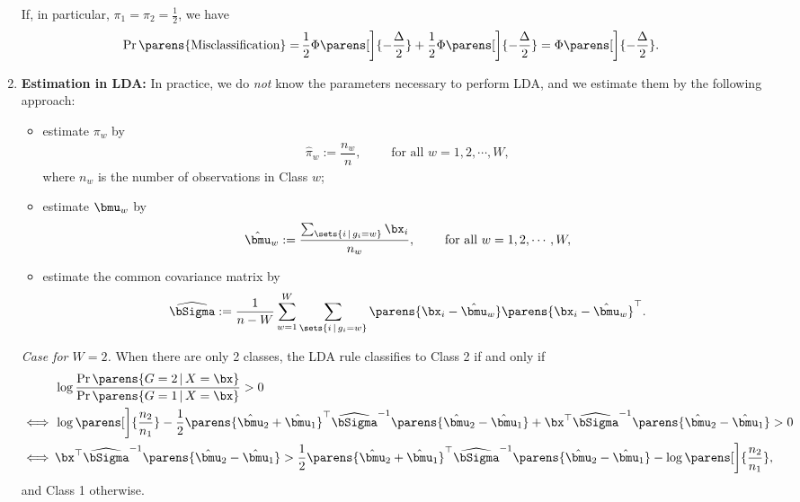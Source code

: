 \documentclass[12pt]{article}
\begin{document}
\begin{enumerate}[label=\textbf{\arabic*.}]
	If, in particular, $\pi_1 = \pi_2 = \frac{1}{2}$, we have 
	\begin{align*}
		\Pr \parens{\text{Misclassification}} = & \, \frac{1}{2} \Phi \parens[\bigg]{- \frac{\Delta}{2}} + \frac{1}{2} \Phi \parens[\bigg]{- \frac{\Delta}{2}} = \Phi \parens[\bigg]{- \frac{\Delta}{2}}. 
	\end{align*}
	
	\item \textbf{Estimation in LDA:} In practice, we do \emph{not} know the parameters necessary to perform LDA, and we estimate them by the following approach: 
	\begin{itemize}
		\item estimate $\pi_w$ by 
		\begin{align*}
			\hat{\pi}_w := \dfrac{n_w}{n}, \qquad \text{ for all } w = 1, 2, \cdots, W, 
		\end{align*}
		where $n_w$ is the number of observations in Class $w$; 
		\item estimate $\bmu_w$ by 
		\begin{align*}
			\hat{\bmu}_w := \dfrac{\sum_{\sets{i \,\vert\, g_i = w}} \bx_i}{n_w}, \qquad \text{ for all } w = 1, 2, \cdots, W, 
		\end{align*}
		\item estimate the common covariance matrix by 
		\begin{align*}
			\widehat{\bSigma} := \dfrac{1}{n-W} \sum_{w=1}^W \sum_{\sets{i \,\vert\, g_i = w}} \parens{\bx_i - \hat{\bmu}_w}\parens{\bx_i - \hat{\bmu}_w}^\top. 
		\end{align*}
	\end{itemize}
	
	\textit{Case for $W = 2$.} When there are only 2 classes, the LDA rule classifies to Class 2 if and only if
	\begin{align}
		& \, \log \frac{\Pr \parens{G = 2 \,\vert\, X = \bx}}{\Pr \parens{G = 1 \,\vert\, X = \bx}} > 0 \nonumber \\ 
		\iff & \, \log \parens[\bigg]{\frac{n_2}{n_1}} - \frac{1}{2} \parens{\hat{\bmu}_2 + \hat{\bmu}_1}^\top \widehat{\bSigma}^{-1} \parens{\hat{\bmu}_2 - \hat{\bmu}_1} + \bx^\top \widehat{\bSigma}^{-1} \parens{\hat{\bmu}_2 - \hat{\bmu}_1} > 0 \nonumber \\ 
		\iff & \, \bx^\top \widehat{\bSigma}^{-1} \parens{\hat{\bmu}_2 - \hat{\bmu}_1} > \frac{1}{2} \parens{\hat{\bmu}_2 + \hat{\bmu}_1}^\top \widehat{\bSigma}^{-1} \parens{\hat{\bmu}_2 - \hat{\bmu}_1} - \log \parens[\bigg]{\frac{n_2}{n_1}}, \label{eq-lda}
	\end{align}
	and Class 1 otherwise. 
	

\end{enumerate}
\end{document}
